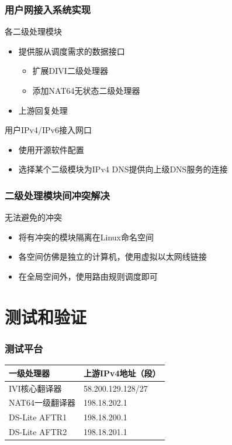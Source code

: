 \documentclass{beamer}
\begin{document}
\begin{frame}
  \frametitle{用户网接入系统实现}

  \begin{block}{各二级处理模块}
    \begin{itemize}
    \item 提供服从调度需求的数据接口
      \begin{itemize}
      \item 扩展DIVI二级处理器
      \item 添加NAT64无状态二级处理器
      \end{itemize}
    \item 上游回复处理
    \end{itemize}
  \end{block}

  \begin{block}{用户IPv4/IPv6接入网口}
    \begin{itemize}
    \item 使用开源软件配置
    \item 选择某个二级模块为IPv4 DNS提供向上级DNS服务的连接
    \end{itemize}
  \end{block}
\end{frame}

\begin{frame}
  \frametitle{二级处理模块间冲突解决}

  \begin{block}{无法避免的冲突}
    \begin{itemize}
    \item 将有冲突的模块隔离在Linux命名空间
    \item 各空间仿佛是独立的计算机，使用虚拟以太网线链接
    \item 在全局空间外，使用路由规则调度即可
    \end{itemize}
  \end{block}
\end{frame}

\section{测试和验证}

\begin{frame}
  \frametitle{测试平台}

  \begin{table}
    \begin{tabular}{l | l}
      一级处理器 & 上游IPv4地址（段）\\
      \hline
      IVI核心翻译器 & 58.200.129.128/27\\
      NAT64一级翻译器 & 198.18.202.1\\
      DS-Lite AFTR1 & 198.18.200.1\\
      DS-Lite AFTR2 & 198.18.201.1\\
    \end{tabular}
  \end{table}
\end{frame}
\end{document}

